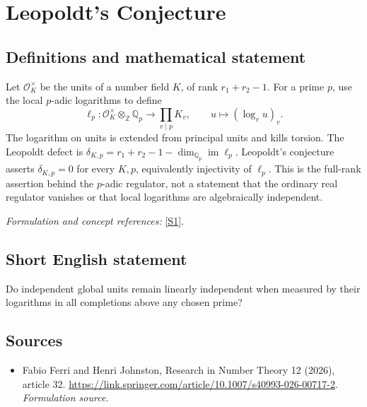 \documentclass[11pt]{article}
\begin{document}
\section*{\texorpdfstring{Leopoldt's Conjecture}{Leopoldt's Conjecture}}\label{1273}
\subsection{Definitions and mathematical statement}
Let $\mathcal O_K^\times$ be the units of a number field $K$, of rank $r_1+r_2-1$. For a prime $p$, use the local $p$-adic logarithms to define
\[
 \ell_p:\mathcal O_K^\times\otimes_{{\mathbb{Z}}}{\mathbb{Q}}_p\longrightarrow\prod_{v\mid p}K_v,
 \qquad u\longmapsto(\log_v u)_v.
\]
The logarithm on units is extended from principal units and kills torsion. The Leopoldt defect is
$\delta_{K,p}=r_1+r_2-1-\dim_{{\mathbb{Q}}_p}\operatorname{im}\ell_p$.
Leopoldt's conjecture asserts $\delta_{K,p}=0$ for every $K,p$, equivalently injectivity of $\ell_p$. This is the full-rank assertion behind the $p$-adic regulator, not a statement that the ordinary real regulator vanishes or that local logarithms are algebraically independent.
\par\smallskip\textit{Formulation and concept references:} \href{https://link.springer.com/article/10.1007/s40993-026-00717-2}{[S1]}.

\subsection{Short English statement}
Do independent global units remain linearly independent when measured by their logarithms in all completions above any chosen prime?
\subsection{Sources}
\begin{itemize}
\item[S1]Fabio Ferri and Henri Johnston, Research in Number Theory 12 (2026), article 32.
\url{https://link.springer.com/article/10.1007/s40993-026-00717-2}.
\textit{Formulation source.}
\end{itemize}
\end{document}

